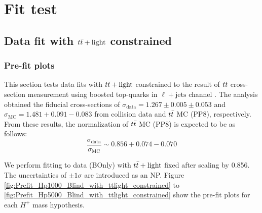 \section{Fit test}
\label{app:FitTest}

\subsection{Data fit with $t\Bar{t}+\text{light}$ constrained}
\label{subapp:DataFit_w_ttlight_constrained}

\subsubsection{Pre-fit plots}
This section tests data fits with $t\Bar{t}+\text{light}$ constrained to the result of $t\Bar{t}$ cross-section measurement using boosted top-quarks in $\ell+\text{jets}$ channel \cite{aad2022measurements}. The analysis obtained the fiducial cross-sections of $\sigma_{\text{data}} = 1.267 \pm 0.005 \pm 0.053$ and $\sigma_{\text{MC}} = 1.481 + 0.091 - 0.083$ from collision data and $t\Bar{t}$ MC (PP8), respectively. From these results, the normalization of $t\Bar{t}$ MC (PP8) is expected to be as follows:
\begin{equation}
    \frac{\sigma_{\text{data}}}{\sigma_{\text{MC}}} \sim 0.856 + 0.074 - 0.070
\end{equation}

We perform fitting to data (BOnly) with $t\Bar{t}+\text{light}$ fixed after scaling by 0.856. The uncertainties of $\pm 1\sigma$ are introduced as an NP.  Figure \ref{fig:Prefit_Hp1000_Blind_with_ttlight_constrained} to \ref{fig:Prefit_Hp5000_Blind_with_ttlight_constrained} show the pre-fit plots for each $H^{+}$ mass hypothesis. 

